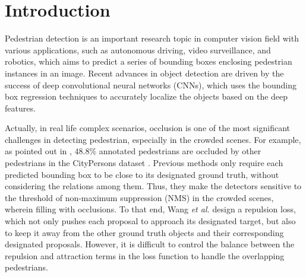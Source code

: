 \documentclass[runningheads]{llncs}
\def\etal{{\em et al. }}
\begin{document}
\section{Introduction}

Pedestrian detection is an important research topic in computer vision field with various applications, such as autonomous driving, video surveillance, and robotics, which aims to predict a series of bounding boxes enclosing pedestrian instances in an image. Recent advances in object detection \cite{DBLP:conf/iccv/Girshick15,DBLP:journals/pami/RenHG017,DBLP:conf/nips/DaiLHS16,DBLP:conf/cvpr/LinDGHHB17,DBLP:confs/cvpr/ZhangSF18,DBLP:journals/corr/abs-1712-02408} are driven by the success of deep convolutional neural networks (CNNs), which uses the bounding box regression techniques to accurately localize the objects based on the deep features.


Actually, in real life complex scenarios, occlusion is one of the most significant challenges in detecting pedestrian, especially in the crowded scenes. For example, as pointed out in \cite{DBLP:journals/corr/abs-1711-07752}, $48.8\%$ annotated pedestrians are occluded by other pedestrians in the CityPersons dataset \cite{DBLP:conf/cvpr/ZhangBS17}. Previous methods only require each predicted bounding box to be close to its designated ground truth, without considering the relations among them. Thus, they make the detectors sensitive to the threshold of non-maximum suppression (NMS) in the crowded scenes, wherein filling with occlusions. To that end, Wang \etal \cite{DBLP:journals/corr/abs-1711-07752} design a repulsion loss, which not only pushes each proposal to approach its designated target, but also to keep it away from the other ground truth objects and their corresponding designated proposals. However, it is difficult to control the balance between the repulsion and attraction terms in the loss function to handle the overlapping pedestrians.
\end{document}
